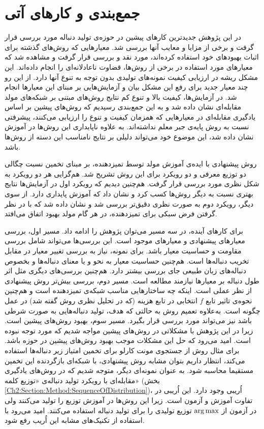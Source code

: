 \chapter{جمع‌بندی و کار‌های آتی}\label{Chap:Chap6}
\minitoc
در این پژوهش  جدیدترین کار‌های پیشین در حوزه‌ی تولید دنباله مورد بررسی قرار گرفت و  برخی از مزایا و معایب آنها بررسی شد. معیار‌هایی که روش‌های گذشته برای اثبات بهبودهای خود استفاده کرده‌اند، مورد نقد و بررسی قرار گرفت و مشاهده شد که  معیارهای مورد استفاده در برخی از روش‌ها، قضاوت ناعادلانه‌ای را انجام داده‌اند.
این مشکل  ریشه در ارزیابی کیفیت نمونه‌های تولیدی  بدون توجه به تنوع آنها دارد.
از این رو چند معیار جدید برای رفع این مشکل بیان و آزمایش‌هایی بر مبنای این معیارها انجام شد.
در آزمایش‌ها، کیفیت بالا و تنوع کم نتایج روش‌های مبتنی بر شبکه‌های مولد مقابله‌ای نشان داده شد و به این جمع‌بندی رسیدیم که روش‌های پیشین بر اساس یادگیری  مقابله‌ای در معیار‌هایی که همزمان کیفیت و تنوع را ارزیابی می‌کنند، پیشرفتی نسبت به روش پایه‌ی جبر معلم نداشته‌اند.
به علاوه ناپایداری این روش‌ها در آموزش نشان داده شد، این موضوع خود می‌تواند دلیلی بر نتایج نامناسب این دسته از روش‌ها باشد.


روش پیشنهادی با ایده‌ی آموزش  مولد توسط تمیزدهنده، بر مبنای تخمین نسبت چگالی دو توزیع معرفی و دو رویکرد برای این روش تشریح شد.
هم‌گرایی هر دو رویکرد به شکل نظری مورد بررسی قرار گرفت. هم‌چنین دیدیم که رویکرد اول در آزمایش‌ها نتایج بهتری نسبت به دیگر روش‌ها کسب کرد و نشان داد که آموزش پایداری دارد. از سوی دیگر، رویکرد دوم به صورت نظری دقیق‌تر بررسی شد و نشان داده شد که با در نظر گرفتن فرض سبکی برای تمیزدهنده، در هر گام مولد بهبود اتفاق می‌افتد.


برای کارهای آینده، در سه مسیر می‌توان پژوهش را ادامه داد.
\newline
مسیر اول، بررسی معیار‌های پیشنهادی و معیار‌های موجود است.
این بررسی‌ها می‌تواند شامل بررسی  مقاومت و حساسیت معیار  باشد. برای نمونه، نیاز به بررسی تغییر معیار در مقابل تخریب دنباله‌ها است. هم‌چنین حساسیت معیار به نحو و یا معنای دنباله‌ها و بخصوص دنباله‌های زبان طبیعی جای بررسی بیشتر دارد. هم‌چنین بررسی‌های دیگری مثل اثر طول دنباله بر معیارها نیازمند مطالعه است.
\newline
مسیر دوم، بررسی بیش‌تر روش پیشنهادی از نظر عملی است. اینکه چه ساختار‌هایی مناسب شبکه‌ی تمیزدهنده است و هم‌چنین نحوه‌ی تاثیر تابع
$f$
انتخابی در تابع هزینه (که در تحلیل نظری روش گفته شد) در عمل چگونه است. به‌علاوه تعمیم روش به حالتی که هدف، تولید دنباله‌هایی  به صورت شرطی باشد نیز می‌تواند مورد بررسی قرار بگیرد.
\newline
مسیر سوم، بهبود روش‌های پیشین است. زیرا در  این پژوهش با مشکلاتی در روش‌های پیشین مواجه شدیم که مورد توجه نبوده است. 
امید می‌رود که حل این مشکلات موجب بهبود روش‌های پیشین در حوزه باشد. برای مثال روش
از جستجوی مونت کارلو برای تخمین امتیاز زیر دنباله‌ها استفاده می‌کند، انتظار داریم بتوان مشابه روش پیشنهادی، با شبکه‌ای بازگردنده این تخمین مستقیما محاسبه شود. به عنوان نمونه‌ای دیگر، متوجه شدیم که در روش‌های یادگیری مقابله‌ای با رویکرد تولید دنباله‌ی «توزیع کلمه» (بخش 
\ref{Ch2:Section:Method:SequenceOfDistribution})،
اُریبی وجود دارد. این اُریبی در تفاوت آموزش و آزمون است. زیرا این روش‌ها در آموزش توزیع را تولید می‌کنند ولی در آزمون از 
$\operatorname*{arg\,max}$
توزیع تولیدی را برای تولید دنباله استفاده می‌کنند. امید می‌رود با استفاده از تکنیک‌های مشابه
این اُریب رفع شود.


